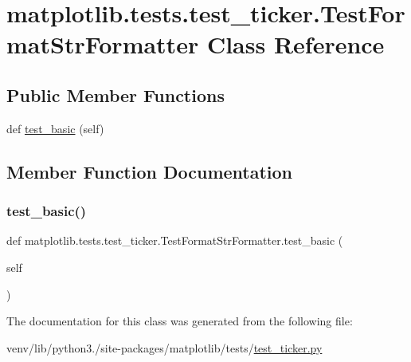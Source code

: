 \hypertarget{classmatplotlib_1_1tests_1_1test__ticker_1_1TestFormatStrFormatter}{}\section{matplotlib.\+tests.\+test\+\_\+ticker.\+Test\+Format\+Str\+Formatter Class Reference}
\label{classmatplotlib_1_1tests_1_1test__ticker_1_1TestFormatStrFormatter}
\subsection*{Public Member Functions}
\begin{DoxyCompactItemize}
\item 
def \hyperlink{classmatplotlib_1_1tests_1_1test__ticker_1_1TestFormatStrFormatter_a9935948a017df327738c97550bb45415}{test\+\_\+basic} (self)
\end{DoxyCompactItemize}


\subsection{Member Function Documentation}
\mbox{\label{classmatplotlib_1_1tests_1_1test__ticker_1_1TestFormatStrFormatter_a9935948a017df327738c97550bb45415}} 
\subsubsection{\texorpdfstring{test\+\_\+basic()}{test\_basic()}}
{\footnotesize\ttfamily def matplotlib.\+tests.\+test\+\_\+ticker.\+Test\+Format\+Str\+Formatter.\+test\+\_\+basic (\begin{DoxyParamCaption}\item[{}]{self }\end{DoxyParamCaption})}



The documentation for this class was generated from the following file\+:\begin{DoxyCompactItemize}
\item 
venv/lib/python3./site-\/packages/matplotlib/tests/\hyperlink{test__ticker_8py}{test\+\_\+ticker.\+py}\end{DoxyCompactItemize}
